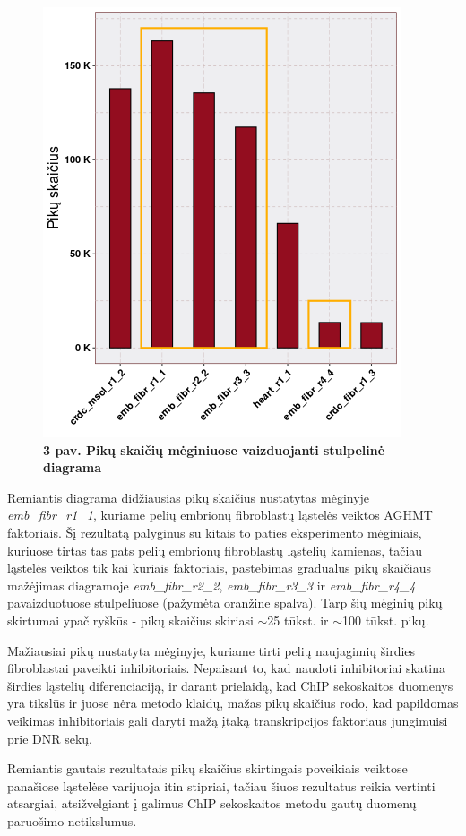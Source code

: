\documentclass[12pt]{article}
\begin{document}
\begin{figure}[htb]
    \begin{center}
        \includegraphics[width=0.5\linewidth]{../Figures/total_peak_counts.png}
        \vspace{-2\baselineskip}
        \caption*{\small\textbf{3 pav. Pikų skaičių mėginiuose vaizduojanti
                                stulpelinė diagrama}}
    \end{center}
\end{figure}

Remiantis diagrama didžiausias pikų skaičius
nustatytas mėginyje \small\emph{emb\_fibr\_r1\_1}, kuriame pelių embrionų
fibroblastų ląstelės veiktos AGHMT faktoriais.
Šį rezultatą palyginus su kitais to paties eksperimento mėginiais, kuriuose
tirtas tas pats pelių embrionų fibroblastų ląstelių kamienas, tačiau ląstelės
veiktos tik kai kuriais faktoriais, pastebimas gradualus pikų skaičiaus
mažėjimas diagramoje
\small\emph{emb\_fibr\_r2\_2}, \small\emph{emb\_fibr\_r3\_3} ir
\small\emph{emb\_fibr\_r4\_4} pavaizduotuose stulpeliuose (pažymėta
oranžine spalva). Tarp šių mėginių pikų skirtumai ypač ryškūs - pikų
skaičius skiriasi \(\sim\)25 tūkst. ir \(\sim\)100 tūkst. pikų.

Mažiausiai pikų nustatyta mėginyje, kuriame tirti pelių naujagimių širdies
fibroblastai paveikti inhibitoriais. Nepaisant to, kad naudoti inhibitoriai
skatina širdies ląstelių diferenciaciją\cite{HEART_CELL_DIFF_ARTCL}, ir darant
prielaidą, kad ChIP sekoskaitos duomenys yra tikslūs ir juose nėra
metodo klaidų, mažas pikų skaičius rodo, kad papildomas veikimas inhibitoriais
gali daryti mažą įtaką transkripcijos faktoriaus jungimuisi prie DNR sekų.

Remiantis gautais rezultatais pikų skaičius skirtingais poveikiais veiktose
panašiose ląstelėse varijuoja itin stipriai, tačiau šiuos rezultatus reikia
vertinti atsargiai, atsižvelgiant į galimus ChIP sekoskaitos metodu gautų
duomenų paruošimo netikslumus.
\end{document}
